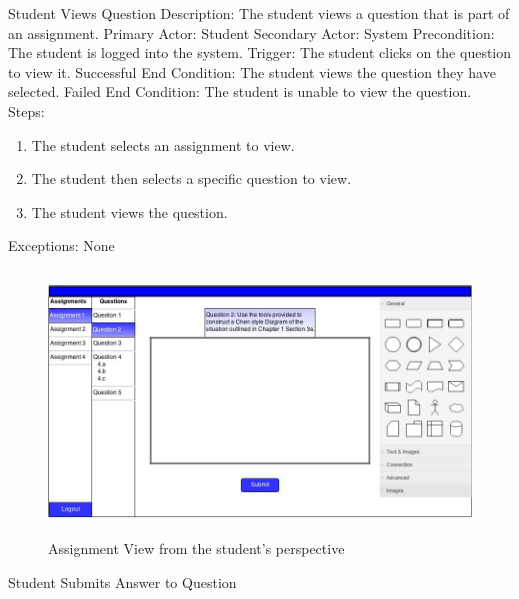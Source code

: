     
    \begin{section}{Student Views Question}
        Description: The student views a question that is part of an assignment. \newline
        Primary Actor: Student \newline
        Secondary Actor: System \newline
        Precondition: The student is logged into the system. \newline
        Trigger: The student clicks on the question to view it. \newline
        Successful End Condition: The student views the question they have selected. \newline
        Failed End Condition: The student is unable to view the question. \newline
        \newline
        Steps:
        \begin{enumerate}
            \item{The student selects an assignment to view.}
            \item{The student then selects a specific question to view.}
            \item{The student views the question.}
        \end{enumerate}
        Exceptions: None
        
                    \begin{figure}[H]
            \centerline{\includegraphics[height=7cm]{StudentQuestion.jpg}}
            \caption{Assignment View from the student's perspective}
    \end{figure}
        
    \end{section}

    
    
    \begin{section}{Student Submits Answer to Question}
    
    \end{section}
    

